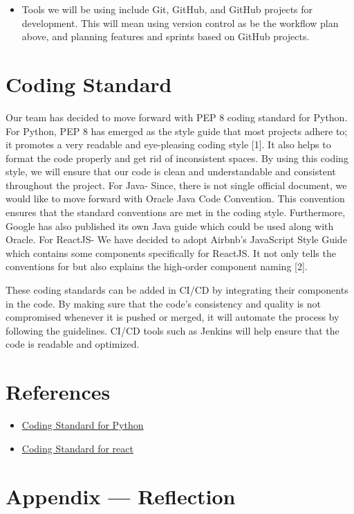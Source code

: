 \documentclass{article}
\begin{document}
\begin{itemize}
  \item Tools we will be using include Git, GitHub, and GitHub projects for development. This will mean using version control as be the workflow plan above, and planning features and sprints based on GitHub projects. 
\end{itemize}

\section{Coding Standard}

Our team has decided to move forward with PEP 8 coding standard for Python. For Python, PEP 8 has emerged as the style guide that most projects adhere to; it promotes a very readable and eye-pleasing coding style [1]. It also helps to format the code properly and get rid of inconsistent spaces. By using this coding style, we will ensure that our code is clean and understandable and consistent throughout the project.
For Java- Since, there is not single official document, we would like to move forward with Oracle Java Code Convention. This convention ensures that the standard conventions are met in the coding style. Furthermore, Google has also published its own Java guide which could be used along with Oracle.
For ReactJS- We have decided to adopt Airbnb's JavaScript Style Guide which contains some components specifically for ReactJS. It not only tells the conventions for but also explains the high-order component naming [2].

These coding standards can be added in CI/CD by integrating their components in the code. By making sure that the code's consistency and quality is not compromised whenever it is pushed or merged, it will automate the process by following the guidelines.
CI/CD tools such as Jenkins will help ensure that the code is readable and optimized. 

\section{References}
\begin{itemize}
  \item
  \href{https://www.geeksforgeeks.org/pep-8-coding-style-guide-python/}{Coding Standard for Python}
  \item
  \href{https://airbnb.io/javascript/react/} {Coding Standard for react}
\end {itemize}

\newpage{}

\section*{Appendix --- Reflection}
\end{document}

